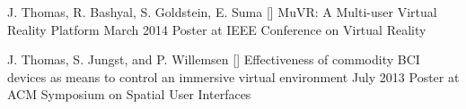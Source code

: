 \begin{cventries}
  \cventry
    {J. Thomas, R. Bashyal, S. Goldstein, E. Suma} %
    {[\thenpubs] MuVR: A Multi-user Virtual Reality Platform} %
    {March 2014} %
    {} %
    {Poster at IEEE Conference on Virtual Reality} %
    
  \cventry
    {J. Thomas, S. Jungst, and P. Willemsen} %
    {[\thenpubs] Effectiveness of commodity BCI devices as means to control an immersive virtual environment} %
    {July 2013} %
    {} %
    {Poster at ACM Symposium on Spatial User Interfaces} %

\end{cventries}

